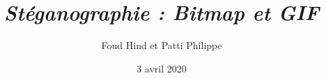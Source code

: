 \documentclass[french, a4paper, 10pt]{article} %
\begin{document}
\lhead{ } %
\cfoot{ } %
\rfoot{\thepage} %
\renewcommand{\headrulewidth}{0.4pt} 
\renewcommand{\footrulewidth}{0.4pt} 
\setcounter{tocdepth}{1}    %
\setcounter{secnumdepth}{5} %
\title{\emph{\textbf{Stéganographie : Bitmap et GIF}}}
\author{Foud Hind et Patti Philippe}
\date{3 avril 2020}
\maketitle
\tableofcontents



\printindex			%
\end{document}
